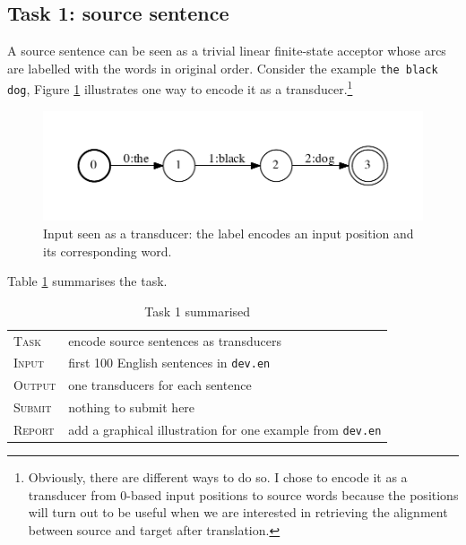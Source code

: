 

\subsection{Task 1: source sentence}

A source sentence can be seen as a trivial linear finite-state acceptor whose arcs are labelled with the words in original order. Consider the example \texttt{the black dog}, Figure \ref{fig:src} illustrates one way to encode it as a transducer.\footnote{Obviously, there are different ways to do so. I chose to encode it as a transducer from 0-based input positions to source words because the positions will turn out to be useful when we are interested in retrieving the alignment between source and target after translation.}

\begin{figure}[h]\centering
\includegraphics[scale=0.5]{src.pdf}
\caption{\label{fig:src}Input seen as a transducer: the label encodes an input position and its corresponding word.}
\end{figure}

Table \ref{tab:task1} summarises the task. 

\begin{table}[h]\centering
\begin{tabular}{l p{12cm}}
\textsc{Task}   &  encode source sentences as transducers \\
\textsc{Input}  &  first 100 English sentences in \texttt{dev.en} \\
\textsc{Output} &  one transducers for each sentence\\
\textsc{Submit} & nothing to submit here\\
\textsc{Report} & add a graphical illustration for one example from \texttt{dev.en} \\
\end{tabular}
\caption{\label{tab:task1}Task 1 summarised}
\end{table}
